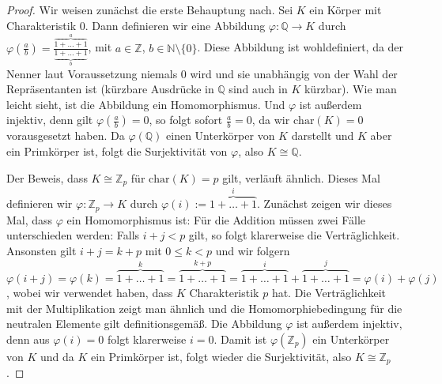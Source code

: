 \begin{proof}
    Wir weisen zunächst die erste Behauptung nach. Sei $K$ ein Körper mit Charakteristik $0$.
    Dann definieren wir eine Abbildung $\varphi:\mathbb{Q}\to K$ durch $\varphi(\frac{a}{b})=\frac{\overbrace{1+\ldots+1}^{a}}{\underbrace{1+\ldots+1}_{b}}$,
    mit $a\in \mathbb{Z}$, $b\in\mathbb{N}\setminus\{0\}$. Diese Abbildung ist wohldefiniert,
    da der Nenner laut Voraussetzung niemals $0$ wird und sie unabhängig von der Wahl der Repräsentanten ist
    (kürzbare Ausdrücke in $\mathbb{Q}$ sind auch in $K$ kürzbar).
    Wie man leicht sieht, ist die Abbildung ein Homomorphismus. Und $\varphi$ ist außerdem injektiv, denn gilt
    $\varphi(\frac{a}{b})=0$, so folgt sofort $\frac{a}{b}=0$, da wir $\mathrm{char}(K)=0$ vorausgesetzt haben.
    Da $\varphi(\mathbb{Q})$ einen Unterkörper von $K$ darstellt und $K$ aber ein Primkörper ist, folgt die Surjektivität von $\varphi$,
    also $K\cong \mathbb{Q}$.

    Der Beweis, dass $K\cong\mathbb{Z}_p$ für $\mathrm{char}(K)=p$ gilt, verläuft ähnlich.
    Dieses Mal definieren wir $\varphi:\mathbb{Z}_p\to K$ durch $\varphi(i):=\overbrace{1+\ldots+1}^{i}$.
    Zunächst zeigen wir dieses Mal, dass $\varphi$ ein Homomorphismus ist:
    Für die Addition müssen zwei Fälle unterschieden werden: Falls $i+j<p$ gilt, so folgt klarerweise die
    Verträglichkeit. Ansonsten gilt $i+j=k+p$ mit $0\le k< p$ und wir folgern 
    $\varphi(i+j)=\varphi(k)=\overbrace{1+\ldots+1}^{k}=\overbrace{1+\ldots+1}^{k+p}=\overbrace{1+\ldots+1}^{i}+\overbrace{1+\ldots+1}^{j}=\varphi(i)+\varphi(j)$,
    wobei wir verwendet haben, dass $K$ Charakteristik $p$ hat. Die Verträglichkeit mit der Multiplikation zeigt man ähnlich
    und die Homomorphiebedingung für die neutralen Elemente gilt definitionsgemäß. Die Abbildung
    $\varphi$ ist außerdem injektiv, denn aus $\varphi(i)=0$ folgt klarerweise $i=0$. Damit ist
    $\varphi(\mathbb{Z}_p)$ ein Unterkörper von $K$ und da $K$ ein Primkörper ist, folgt wieder die Surjektivität,
    also $K\cong \mathbb{Z}_p$.


\end{proof}
